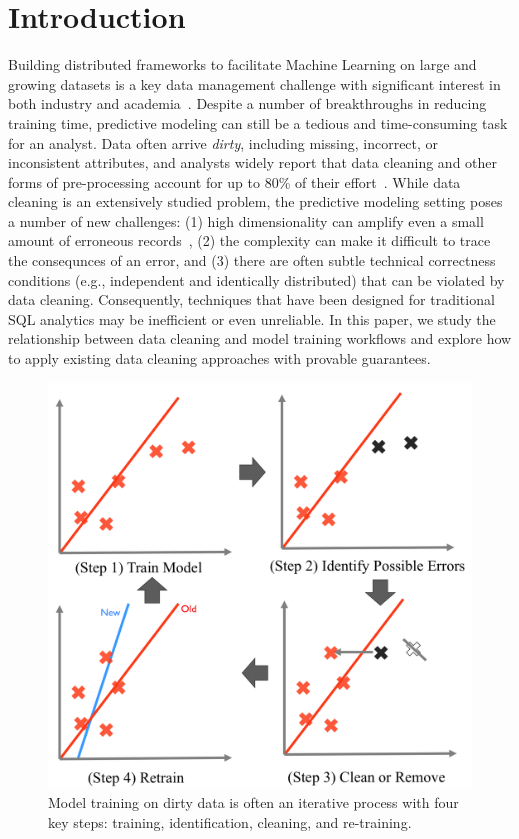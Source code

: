 \section{Introduction}
Building distributed frameworks to facilitate Machine Learning on large and growing datasets is a key data management challenge with significant interest in both industry and academia~\cite{bdas, alexandrov2014stratosphere, crotty2014tupleware, tensor}.
Despite a number of breakthroughs in reducing training time, predictive modeling can still be a tedious and time-consuming task for an analyst. 
Data often arrive \emph{dirty}, including missing, incorrect, or inconsistent attributes, and analysts widely report that data cleaning and other forms of pre-processing account for up to 80\% of their effort~\cite{nytimes, kandel2012}.
While data cleaning is an extensively studied problem, the predictive modeling setting poses a number of new challenges: (1) high dimensionality can amplify even a small amount of erroneous records~\cite{xiaofeature}, (2) the complexity can make it difficult to trace the consequnces of an error, and (3) there are often subtle technical correctness conditions (e.g., independent and identically distributed) that can be violated by data cleaning.
Consequently, techniques that have been designed for traditional SQL analytics may be inefficient or even unreliable.
In this paper, we study the relationship between data cleaning and model training workflows and explore how to apply existing data cleaning approaches with provable guarantees.

\begin{figure}[t]
\centering
 \includegraphics[width=0.8\columnwidth]{figs/update-arch4.png}
 \caption{Model training on dirty data is often an iterative process with four key steps: training, identification, cleaning, and re-training. \label{teaser}}\vspace{-1.5em}
\end{figure}

